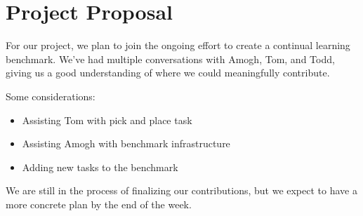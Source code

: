 \documentclass[12pt]{article}
\begin{document}
\psetheader %

\section*{Project Proposal}

For our project, we plan to join the ongoing effort to create a continual learning benchmark. We've had
multiple conversations with Amogh, Tom, and Todd, giving us a good understanding of where we could
meaningfully contribute.

Some considerations:
\begin{itemize}
		\item Assisting Tom with pick and place task
		\item Assisting Amogh with benchmark infrastructure
		\item Adding new tasks to the benchmark
\end{itemize}

We are still in the process of finalizing our contributions, but we expect to have a more concrete plan by
the end of the week.
\end{document}
